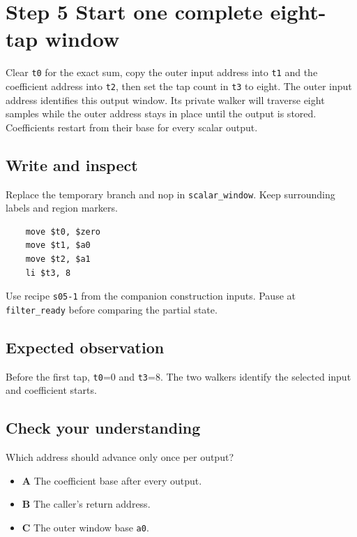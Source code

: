 \section{Step 5 Start one complete eight-tap window}\label{fir-s05}

Clear \texttt{t0} for the exact sum, copy the outer input address into \texttt{t1} and the coefficient address into \texttt{t2}, then set the tap count in \texttt{t3} to eight. The outer input address identifies this output window. Its private walker will traverse eight samples while the outer address stays in place until the output is stored. Coefficients restart from their base for every scalar output.

\subsection{Write and inspect}
Replace the temporary branch and nop in \texttt{scalar\_window}. Keep surrounding labels and region markers.

\begin{verbatim}
    move $t0, $zero
    move $t1, $a0
    move $t2, $a1
    li $t3, 8
\end{verbatim}
Use recipe \texttt{s05-1} from the companion construction inputs. Pause at \texttt{filter\_ready} before comparing the partial state.

\subsection{Expected observation}
Before the first tap, \texttt{t0}=0 and \texttt{t3}=8. The two walkers identify the selected input and coefficient starts.

\subsection{Check your understanding}
Which address should advance only once per output?

\begin{itemize}
\item \textbf{A} The coefficient base after every output.
\item \textbf{B} The caller’s return address.
\item \textbf{C} The outer window base \texttt{a0}.
\end{itemize}
